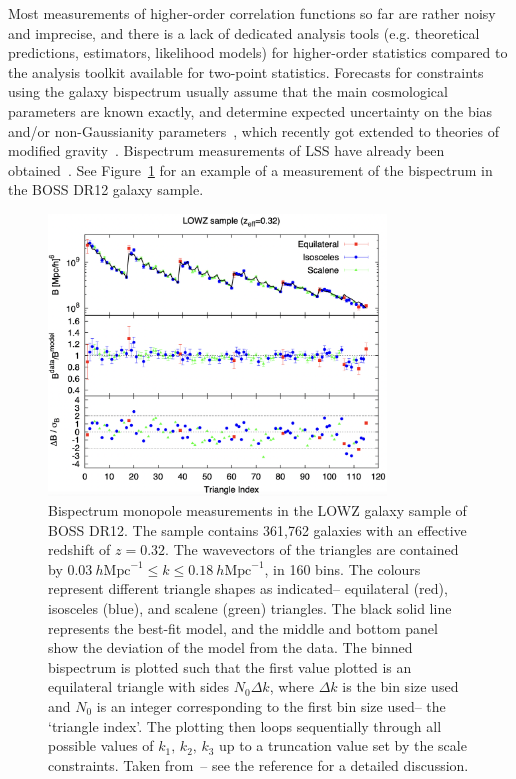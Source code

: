Most measurements of higher-order correlation functions so far are rather noisy and imprecise, and there is a lack of dedicated analysis tools (e.g. theoretical predictions, estimators, likelihood models) for higher-order statistics compared to the analysis toolkit available for two-point statistics. Forecasts for constraints using the galaxy bispectrum usually assume that the main cosmological parameters are known exactly, and determine expected uncertainty on the bias and/or non-Gaussianity parameters~\cite{Scoccimarro:2003wn,Sefusatti:2007ih,Song:2015gca,Tellarini:2016sgp,Yamauchi:2016wuc,Karagiannis:2018jdt}, which recently got extended to theories of modified gravity~\cite{Yamauchi:2017ibz}. Bispectrum measurements of LSS have already been obtained~\cite{Scoccimarro:2000sp,Feldman:2000vk,WiggleZ:2013kor,Gil-Marin:2014pva,Gil-Marin:2016wya,Verde:2001sf}. See Figure~\ref{fig:example_measurementB} for an example of a measurement of the bispectrum in the BOSS DR12 galaxy sample. 

\begin{figure}[!ht]
	\centering
	\includegraphics[width=0.8\textwidth]{fig/boss_bispmeasurement.png}
	\caption{Bispectrum monopole measurements in the LOWZ galaxy sample of BOSS DR12. The sample contains 361,762 galaxies with an effective redshift of $z = 0.32$. The wavevectors of the triangles are contained by $0.03~h\mathrm{Mpc}^{-1} \leq k \leq 0.18~h\mathrm{Mpc}^{-1}$, in 160 bins. The colours represent different triangle shapes as indicated-- equilateral (red), isosceles (blue), and scalene (green) triangles. The black solid line represents the best-fit model, and the middle and bottom panel show the deviation of the model from the data. The binned bispectrum is plotted such that the first value plotted is an equilateral triangle with sides $N_0 \Delta k$, where $\Delta k$ is the bin size used and $N_0$ is an integer corresponding to the first bin size used-- the `triangle index'. The plotting then loops sequentially through all possible values of $k_1,\,k_2,\,k_3$ up to a truncation value set by the scale constraints. Taken from~\cite{Gil-Marin:2016wya}-- see the reference for a detailed discussion.}
	\label{fig:example_measurementB}
\end{figure}

